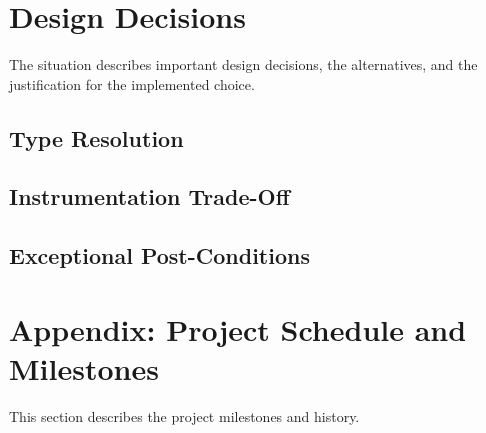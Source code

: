 \documentclass{article}
\begin{document}



\section{Design Decisions}
The situation describes important design decisions, the alternatives, and the justification for the implemented choice.

\subsection{Type Resolution}
\subsection{Instrumentation Trade-Off}
\subsection{Exceptional Post-Conditions}

\appendix

\section{Appendix: Project Schedule and Milestones}
This section describes the project milestones and history.
\end{document}
